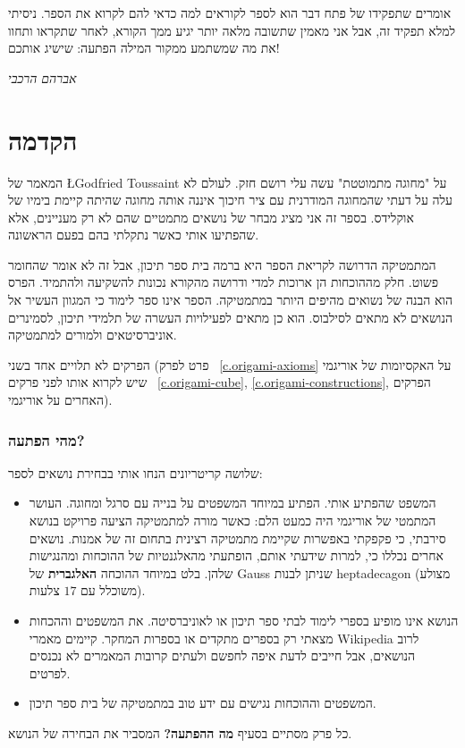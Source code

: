 אומרים שתפקידו של פתח דבר הוא לספר לקוראים למה כדאי להם לקרוא את הספר. ניסיתי למלא תפקיד זה, אבל אני מאמין שתשובה מלאה יותר יגיע ממך הקורא, לאחר שתקראו ותחוו את מה שמשתמע ממקור המילה הפתעה: שישיג אותכם!

\bigskip

\begin{flushleft}
\textit{אברהם הרכבי}
\end{flushleft}


\chapter*{הקדמה}
\thispagestyle{empty}

המאמר של 
\cite{toussaint} \L{Godfried Toussaint}
על "מחוגה מתמוטטת" עשה עלי רושם חזק. לעולם לא עלה על דעתי שהמחוגה המודרנית עם ציר חיכוך איננה אותה מחוגה שהיתה קיימת בימיו של אוקלידס. 
בספר זה אני מציג מבחר של נושאים מתמטיים שהם לא רק מעניינים, אלא שהפתיעו אותי כאשר נתקלתי בהם בפעם הראשונה. 

המתמטיקה הדרושה לקריאת הספר היא ברמה בית ספר תיכון, אבל זה לא אומר שהחומר פשוט. חלק מההוכחות הן ארוכות למדי ודרושה מהקורא נכונות להשקיעה ולהתמיד. הפרס הוא הבנה של נשואים מהיפים היותר במתמטיקה. הספר אינו ספר לימוד כי המגוון העשיר אל הנושאים לא מתאים לסילבוס. הוא כן מתאים לפעילויות העשרה של תלמידי תיכון, לסמינרים אוניברסיטאים ולמורים למתמטיקה.


הפרקים לא תלויים אחד בשני (פרט לפרק~%
\ref{c.origami-axioms}
על האקסיומות של אוריגמי שיש לקרוא אותו לפני פרקים~%
\ref{c.origami-cube}, \ref{c.origami-constructions},
הפרקים האחרים על אוריגמי).

\subsection*{מהי הפתעה?}

שלושה קריטריונים הנחו אותי בבחירת נושאים לספר:
\begin{itemize}
\item 
המשפט שהפתיע אותי. הפתיע במיוחד המשפטים על בנייה עם סרגל ומחוגה. העושר המתמטי של אוריגמי היה כמעט הלם: כאשר מורה למתמטיקה הציעה פרויקט בנושא סירבתי, כי פקפקתי באפשרות שקיימת מתמטיקה רצינית בתחום זה של אמנות. נושאים אחרים נכללו כי, למרות שידעתי אותם, הופתעתי מהאלגנטיות של ההוכחות ומהנגישות שלהן. בלט במיוחד ההוכחה 
\textbf{האלגברית}
של Gauss שניתן לבנות heptadecagon (מצולע משוכלל עם $17$ צלעות).

\item
הנושא אינו מופיע בספרי לימוד לבתי ספר תיכון או לאוניברסיטה. את המשפטים וההכחות מצאתי רק בספרים מתקדים או בספרות המחקר. קיימים מאמרי Wikipedia לרוב הנושאים, אבל חייבים לדעת איפה לחפשם ולעתים קרובות המאמרים לא נכנסים לפרטים.

\item
המשפטים וההוכחות נגישים עם ידע טוב במתמטיקה של בית ספר תיכון.
\end{itemize}
כל פרק מסתיים בסעיף 
\textbf{מה ההפתעה?}
המסביר את הבחירה של הנושא.

